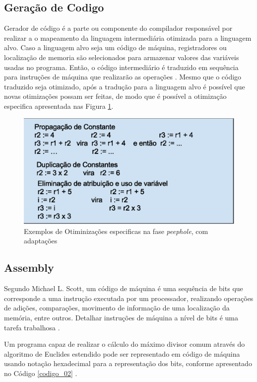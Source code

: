 \subsection{Geração de Codigo}

Gerador de código é a parte ou componente do compilador responsável por 
realizar a o mapeamento da linguagem intermediária otimizada para a linguagem 
alvo. Caso a linguagem alvo seja um código de máquina,  registradores ou 
localização de memoria são selecionados para armazenar valores das 
variáveis usadas no programa. Então, o código intermediário é traduzido em 
sequência para instruções de máquina que realizarão as operações \cite{ref32}.
Mesmo que o código traduzido seja otimizado, após a tradução para a 
linguagem alvo é  possível que novas otimizações possam ser feitas, de modo 
que é possível a otimização especifica apresentada nas Figura \ref{fig02}.

\begin{figure}[h]
    \centering
    \label{fig02}
        \includegraphics[keepaspectratio=true,scale=0.5]{figuras/otimizacao_especifica.eps}
    \caption{Exemplos de Otiminizações especificas na fase \textit{peephole},
             com adaptações \cite{ref33} }
\end{figure}


\subsection{Assembly}

Segundo Michael L. Scott, um código de máquina é uma sequência de bits que
 corresponde a uma instrução executada por um processador, realizando 
operações de adições, comparações, movimento de informação de uma localização
 da memória, entre outros. Detalhar instruções de máquina a nível de bits é 
uma tarefa trabalhosa \cite{ref34}. 

Um programa capaz de realizar o cálculo do máximo divisor comum através do 
algoritmo de Euclides estendido pode ser representado  em código de máquina 
usando notação hexadecimal para a representação dos bits, conforme apresentado
 no Código \ref{codigo_02} .


